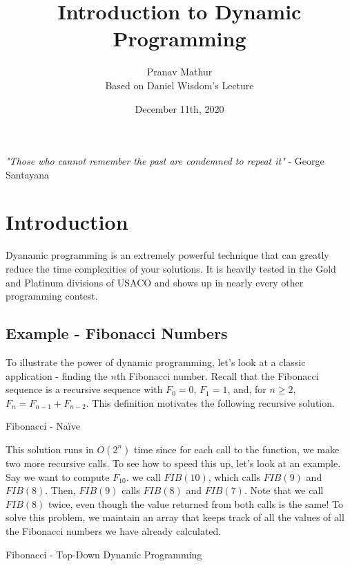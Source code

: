 \documentclass{article}
\title{Introduction to Dynamic Programming}
\author{Pranav Mathur \\ Based on Daniel Wisdom's Lecture}
\date{December 11th, 2020}
\newcommand{\nl}[]{\newline}
\begin{document}
\maketitle

\begin{center}
\emph{"Those who cannot remember the past are condemned to repeat it"}
- George Santayana
\end{center}
\section{Introduction}
Dyanamic programming is an extremely powerful technique that can greatly reduce the time complexities of your solutions. It is heavily tested in the Gold and Platinum divisions of USACO and shows up in nearly every other programming contest.
\subsection{Example - Fibonacci Numbers}
To illustrate the power of dynamic programming, let's look at a classic application - finding the $n$th Fibonacci number. Recall that the Fibonacci sequence is a recursive sequence with $F_0=0$, $F_1=1$, and, for $n\geq 2$, $F_n = F_{n-1} + F_{n-2}$. This definition motivates the following recursive solution.
\begin{algorithm}[H]
\caption{Fibonacci - Naïve}
\begin{algorithmic}
    \Else
    \EndIf
\EndFunction
\end{algorithmic}
\end{algorithm}
\noindent This solution runs in $O(2^n)$ time since for each call to the function, we make two more recursive calls. To see how to speed this up, let's look at an example. Say we want to compute $F_{10}$. we call $FIB(10)$, which calls $FIB(9)$ and $FIB(8)$. Then, $FIB(9)$ calls $FIB(8)$ and $FIB(7)$. Note that we call $FIB(8)$ twice, even though the value returned from both calls is the same!\nl\nl
To solve this problem, we maintain an array that keeps track of all the values of all the Fibonacci numbers we have already calculated.
\begin{algorithm}[H]
\caption{Fibonacci - Top-Down Dynamic Programming}
\begin{algorithmic}
    \EndIf
    \Else
    \EndIf
\EndFunction
\end{algorithmic}
\end{algorithm}
\end{document}
